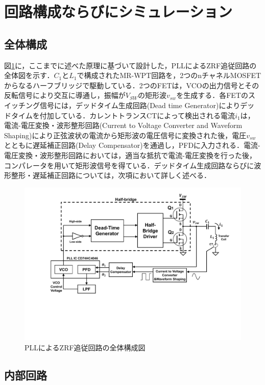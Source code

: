 \section{回路構成ならびにシミュレーション}
\subsection{全体構成}
図\ref{entireblock}に，ここまでに述べた原理に基づいて設計した，PLLによるZRF追従回路の全体図を示す．$C_1$と$L_1$で構成されたMR-WPT回路を，2つのnチャネルMOSFETからなるハーフブリッジで駆動している．2つのFETは，VCOの出力信号とその反転信号により交互に導通し，振幅が$V_{SW}$の矩形波$v_{sw}$を生成する．各FETのスイッチング信号には，デッドタイム生成回路(Dead time Generator)によりデッドタイムを付加している．カレントトランスCTによって検出される電流$i_1$は，電流-電圧変換・波形整形回路(Current to Voltage Converter and Waveform Shaping)により正弦波状の電流から矩形波の電圧信号に変換された後，電圧$v_{sw}$とともに遅延補正回路(Delay Compensator)を通過し，PFDに入力される．電流-電圧変換・波形整形回路においては，適当な抵抗で電流-電圧変換を行った後，コンパレータを用いて矩形波信号を得ている．デッドタイム生成回路ならびに波形整形・遅延補正回路については，次項において詳しく述べる．
\begin{figure}[h]
\begin{center}

\includegraphics[width=130mm]{figures/entireblock.pdf}
\caption{PLLによるZRF追従回路の全体構成図}
\label{entireblock}

\end{center}
\end{figure}

\subsection{内部回路}
